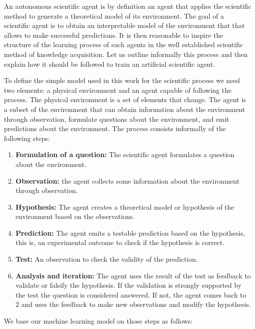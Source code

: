 \documentclass[11pt,a4paper,twoside]{report}
\newcommand{\+}{\textnormal{+} }
\theoremstyle{definition}
\numberwithin{equation}{chapter}
\begin{document}
An autonomous scientific agent is by definition an agent that applies the
scientific method to generate a theoretical model of its environment. The goal
of a scientific agent is to obtain an interpretable model of the environment
that that allows to make successful predictions. It is then reasonable to
inspire the structure of the learning process of such agents in the well
established scientific method of knowledge acquisition. Let us outline
informally this process and then explain how it should be followed to train an
artificial scientific agent.

\par To define the simple model used in this work for the scientific process we
need two elements: a physical environment and an agent capable of following the
process. The physical environment is a set of elements that change. The agent is
a subset of the environment that can obtain information about the environment
through observation, formulate questions about the environment, and emit
predictions about the environment. The process consists informally of
the following steps:
\begin{enumerate}
  \item \textbf{Formulation of a question:} The scientific agent formulates a
  question about the environment.
  \item \textbf{Observation:} the agent collects some information about the
  environment through observation.
  \item  \textbf{Hypothesis:} The agent creates a theoretical model or
  hypothesis of the environment based on the observations.
  \item \textbf{Prediction:} The agent emits a testable prediction based on the
  hypothesis, this is, an experimental outcome to check if the hypothesis is
  correct.
  \item \textbf{Test:} An observation to check the validity of the 
  prediction.
  \item \textbf{Analysis and iteration:} The agent uses the result of the test
  as feedback to validate or falsify the hypothesis. If the validation is 
  strongly supported by the test the question is considered answered. 
  If not, the agent comes back to $2$ and uses the feedback to make new
  observations and modify the hypothesis.
\end{enumerate}

We base our machine learning model on those steps as follows:
\end{document}
